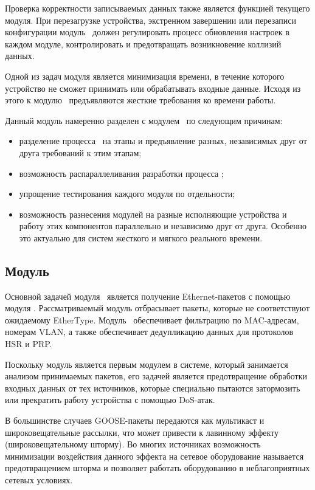 Проверка корректности записываемых данных также является функцией текущего модуля. При перезагрузке устройства, экстренном завершении или перезаписи конфигурации модуль \moduleSettingsApply\ должен регулировать процесс обновления настроек в каждом модуле, контролировать и предотвращать возникновение коллизий данных.

Одной из задач модуля является минимизация времени, в течение которого устройство не сможет принимать или обрабатывать входные данные. Исходя из этого к модулю \moduleSettingsApply\ предъявляются жесткие требования ко времени работы.

Данный модуль намеренно разделен с модулем \moduleCfg\ по следующим причинам:
\begin{itemize}
    \item разделение процесса \moduleSettingsApply\ на этапы и предъявление разных, независимых друг от друга требований к этим этапам;
    \item возможность распараллеливания разработки процесса \moduleSettingsApply;
    \item упрощение тестирования каждого модуля по отдельности;
    \item возможность разнесения модулей на разные исполняющие устройства и работу этих компонентов параллельно и независимо друг от друга. Особенно это актуально для систем жесткого и мягкого реального времени.
\end{itemize}

\subsection{Модуль \moduleRecvPackets}

Основной задачей модуля \moduleRecvPackets\ является получение Ethernet-пакетов с помощью модуля \moduleOsal. Рассматриваемый модуль отбрасывает пакеты, которые не соответствуют ожидаемому EtherType. Модуль \moduleRecvPackets\ обеспечивает фильтрацию по MAC-адресам, номерам VLAN, а также обеспечивает дедупликацию данных для протоколов HSR и PRP.

Поскольку модуль является первым модулем в системе, который занимается анализом принимаемых пакетов, его задачей является предотвращение обработки входных данных от тех источников, которые специально пытаются затормозить или прекратить работу устройства с помощью DoS-атак.


В большинстве случаев GOOSE-пакеты передаются как мультикаст и широковещательные рассылки, что может привести к лавинному эффекту (широковещательному шторму). Во многих источниках возможность минимизации воздействия данного эффекта на сетевое оборудование называется предотвращением шторма и позволяет работать оборудованию в неблагоприятных сетевых условиях.

